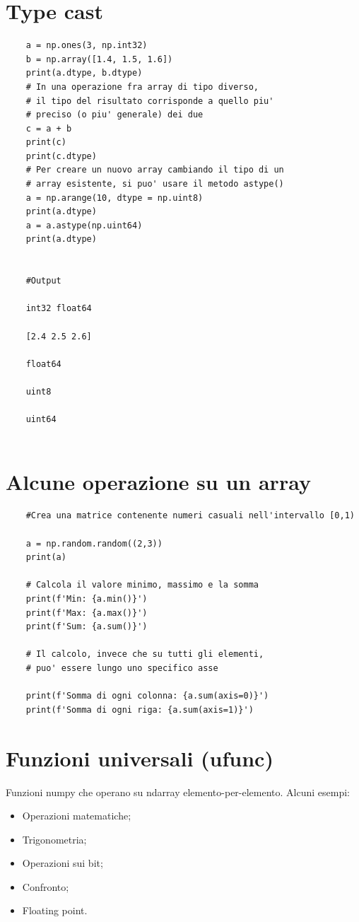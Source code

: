 \newpage

\section{Type cast}

\begin{lstlisting}
	a = np.ones(3, np.int32)
	b = np.array([1.4, 1.5, 1.6])
	print(a.dtype, b.dtype)
	# In una operazione fra array di tipo diverso,
	# il tipo del risultato corrisponde a quello piu'
	# preciso (o piu' generale) dei due
	c = a + b
	print(c)
	print(c.dtype)
	# Per creare un nuovo array cambiando il tipo di un
	# array esistente, si puo' usare il metodo astype()
	a = np.arange(10, dtype = np.uint8)
	print(a.dtype)
	a = a.astype(np.uint64)
	print(a.dtype)

	
	#Output
	
	int32 float64
	
	[2.4 2.5 2.6]
	
	float64
	
	uint8
	
	uint64
	
\end{lstlisting}

\section{Alcune operazione su un array}

\begin{lstlisting}
	#Crea una matrice contenente numeri casuali nell'intervallo [0,1)

	a = np.random.random((2,3))
	print(a)
	
	# Calcola il valore minimo, massimo e la somma
	print(f'Min: {a.min()}')
	print(f'Max: {a.max()}')
	print(f'Sum: {a.sum()}')
	
	# Il calcolo, invece che su tutti gli elementi,
	# puo' essere lungo uno specifico asse
	
	print(f'Somma di ogni colonna: {a.sum(axis=0)}')
	print(f'Somma di ogni riga: {a.sum(axis=1)}')

\end{lstlisting}

\section{Funzioni universali (ufunc)}

Funzioni numpy che operano su ndarray elemento-per-elemento. Alcuni esempi:
\begin{itemize}
	\item Operazioni matematiche;
	\item Trigonometria;
	\item Operazioni sui bit;
	\item Confronto;
	\item Floating point.
\end{itemize}



